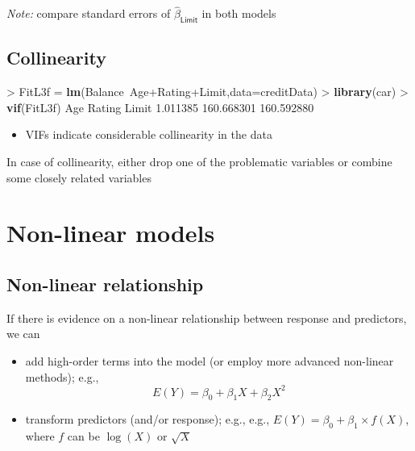 \documentclass[]{article}
\newenvironment{Shaded}{\begin{snugshade}}{\end{snugshade}}
\newcommand{\KeywordTok}[1]{\textcolor[rgb]{0.13,0.29,0.53}{\textbf{{#1}}}}
\newcommand{\DataTypeTok}[1]{\textcolor[rgb]{0.13,0.29,0.53}{{#1}}}
\newcommand{\FloatTok}[1]{\textcolor[rgb]{0.00,0.00,0.81}{{#1}}}
\newcommand{\StringTok}[1]{\textcolor[rgb]{0.31,0.60,0.02}{{#1}}}
\newcommand{\NormalTok}[1]{{#1}}
\providecommand{\tightlist}{%
  \setlength{\itemsep}{0pt}\setlength{\parskip}{0pt}}
\begin{document}
\emph{Note:} compare standard errors of \(\hat{\beta}_{\textsf{Limit}}\)
in both models

\subsection{Collinearity}\label{collinearity-3}

\begin{Shaded}
\begin{Highlighting}[]
\NormalTok{>}\StringTok{ }\NormalTok{FitL3f =}\StringTok{ }\KeywordTok{lm}\NormalTok{(Balance~Age+Rating+Limit,}\DataTypeTok{data=}\NormalTok{creditData)}
\NormalTok{>}\StringTok{ }\KeywordTok{library}\NormalTok{(car)}
\NormalTok{>}\StringTok{ }\KeywordTok{vif}\NormalTok{(FitL3f)}
       \NormalTok{Age     Rating      Limit }
  \FloatTok{1.011385} \FloatTok{160.668301} \FloatTok{160.592880} 
\end{Highlighting}
\end{Shaded}

\begin{itemize}
\tightlist
\item
  VIFs indicate considerable collinearity in the data
\end{itemize}

In case of collinearity, either drop one of the problematic variables or
combine some closely related variables

\section{Non-linear models}\label{non-linear-models}

\subsection{Non-linear relationship}\label{non-linear-relationship}

If there is evidence on a non-linear relationship between response and
predictors, we can

\begin{itemize}
\tightlist
\item
  add high-order terms into the model (or employ more advanced
  non-linear methods); e.g., \[E(Y)=\beta_0+\beta_1 X + \beta_2 X^2\]
\item
  transform predictors (and/or response); e.g., e.g.,
  \(E(Y)=\beta_0+\beta_1 \times f(X)\), where \(f\) can be \(\log(X)\)
  or \(\sqrt{X}\)
\end{itemize}
\end{document}
